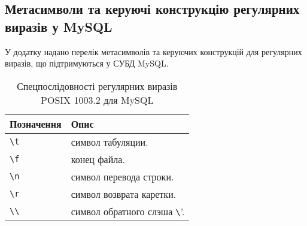 \subsection{Метасимволи та керуючі конструкцію регулярних виразів у MySQL}
\label{chr-rxp:app}
У додатку надано перелік метасимволів та керуючих конструкцій для регулярних виразів, що підтримуються у СУБД MySQL.  

\pagebreak[4]
\begin{longtable}[t]{|l|p{20em}|}
\caption{Спецпослідовності регулярних виразів POSIX 1003.2 для MySQL} \label{chr2-rxp:table}\\
\hline

Позначення & Опис \\
\hline

\verb'\t' & символ табуляции. \\
\verb'\f' & конец файла. \\
\verb'\n' & символ перевода строки. \\
\verb'\r' & символ возврата каретки. \\
\verb'\\' & символ обратного слэша \verb'\'. \\


\hline
\end{longtable}


\pagebreak[3]

